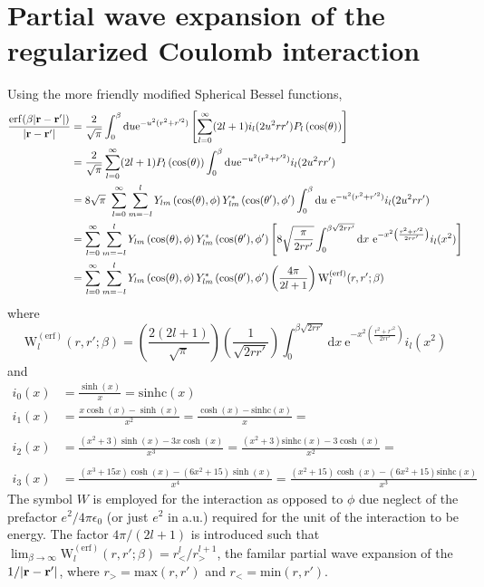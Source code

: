\documentclass[paper=a4, fontsize=11pt]{article} %
\numberwithin{equation}{section} %
\numberwithin{figure}{section} %
\numberwithin{table}{section} %
\newcommand{\br}{{\bf{r}}}
\newcommand{\re}{{\mathrm{e}}}
\newcommand{\rerf}{{\mathrm{erf}}}
\newcommand{\rd}{{\mathrm{d}}}
\newcommand{\PWerf}{\mathrm{W}^{(\mathrm{erf})}}
\newcommand{\sinhc}{\mathrm{sinhc}}
\newcommand{\rgt}{r_{>}}
\newcommand{\rlt}{r_{<}}
\begin{document}
\section{Partial wave expansion of the regularized Coulomb interaction}

Using the more friendly modified Spherical Bessel functions,
\begin{equation}
\begin{split}
\frac{\rerf(\beta|\br-\br'|)}{|\br-\br'|}
&= \frac{2}{\sqrt{\pi}}\int_0^\beta \rd u \re^{-u^2(r^2 + r'^2)}
    \left [\sum_{l=0}^\infty (2l+1) i_{l}(2u^2 r r')P_l\left(\cos(\theta)\right)\right ] \\
&= \frac{2}{\sqrt{\pi}}\sum_{l=0}^\infty (2l+1)P_l\left(\cos(\theta)\right)
      \int_0^\beta \rd u \re^{-u^2(r^2 + r'^2)}i_{l}(2u^2 r r') \\
&= 8\sqrt{\pi}\
      \sum_{l=0}^\infty \sum_{m=-l}^{l} Y_{lm}\left(\cos(\theta),\phi\right)Y_{lm}^*\left(\cos(\theta'),\phi'\right)
      \int_0^\beta \rd u\ \re^{-u^2(r^2 + r'^2)}i_{l}(2u^2 r r') \\
&= \sum_{l=0}^\infty \sum_{m=-l}^{l} Y_{lm}\left(\cos(\theta),\phi\right)Y_{lm}^*\left(\cos(\theta'),\phi'\right)
  \left [ 8 \sqrt{\frac{\pi}{2rr'}}
          \int_0^{\beta\sqrt{2rr'}}\rd x\ \re^{-x^2\left(\frac{r^2 + r'^2}{2rr'}\right)}i_{l}(x^2)
  \right]  \\
&=  \sum_{l=0}^\infty \sum_{m=-l}^{l} Y_{lm}\left(\cos(\theta),\phi\right)Y_{lm}^*\left(\cos(\theta'),\phi'\right)
    \left(\frac{4\pi}{2l+1}\right)\PWerf_l(r,r';\beta)
\end{split}
\end{equation}
where
\begin{equation}
\PWerf_l(r,r';\beta) = \left(\frac{2(2l+1)}{\sqrt{\pi}}\right)\left(\frac{1}{\sqrt{2rr'}}\right)
      \int_0^{\beta\sqrt{2rr'}}\rd x\ \re^{-x^2\left(\frac{r^2 + r'^2}{2rr'}\right)}i_{l}(x^2)
\end{equation}
and
\begin{equation}
\begin{split}
i_0(x) &= \frac{\sinh(x)}{x} = \sinhc(x)\\
i_1(x) &= \frac{x\cosh(x)-\sinh(x)}{x^2} = \frac{\cosh(x)-\sinhc(x)}{x} = \\\\
i_2(x) &= \frac{(x^2+3)\sinh(x)-3x\cosh(x)}{x^3} = \frac{(x^2+3)\sinhc(x)-3\cosh(x)}{x^2} = \\\\
i_3(x) &= \frac{(x^3+15x)\cosh(x)-(6x^2+15)\sinh(x)}{x^4} = \frac{(x^2+15)\cosh(x)-(6x^2+15)\sinhc(x)}{x^3} 
\end{split}
\end{equation}
The symbol $W$ is employed for the interaction as opposed to $\phi$ due neglect of the
prefactor $e^2/4\pi \epsilon_0$ (or just $e^2$ in a.u.) required for the unit of the interaction to be energy.
The factor $4\pi/(2l+1)$ is introduced such that 
$\lim_{\beta\rightarrow\infty}\PWerf_l(r,r';\beta)=\rlt^l/\rgt^{l+1}$, the familar partial wave expansion of
the $1/|\br-\br'|$, where $\rgt = \mathrm{max}(r,r')$ and $\rlt = \mathrm{min}(r,r')$.
\end{document}
